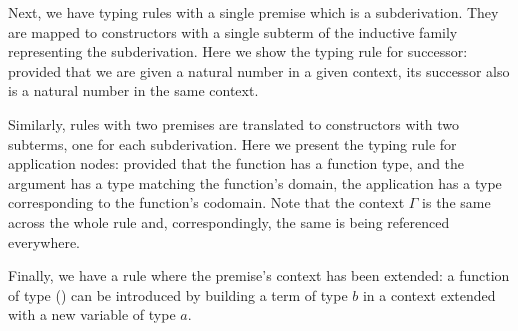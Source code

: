 Next, we have typing rules with a single premise which is a subderivation.
They are mapped to constructors with a single subterm of the inductive family
representing the subderivation.
%
Here we show the typing rule for successor: provided that we are given
a natural number in a given context, its successor also is a natural
number in the same context.

\begin{center}
\begin{minipage}{0.45\textwidth}
\inferenceInc
\end{minipage}\hfill
\begin{minipage}{0.45\textwidth}
\end{minipage}
\end{center}

Similarly, rules with two premises are translated to constructors
with two subterms, one for each subderivation.
%
Here we present the typing rule for application nodes: provided that
the function has a function type, and the argument has a type matching
the function's domain, the application has a type corresponding to the
function's codomain.
Note that the context $\Gamma$ is the same across the whole rule and,
correspondingly, the same  is being referenced everywhere.


\begin{center}
\begin{minipage}{0.35\textwidth}
\inferenceApp
\end{minipage}\hfill
\begin{minipage}{0.55\textwidth}
\end{minipage}
\end{center}

Finally, we have a rule where the premise's context has been extended:
a function of type () can be introduced by building a term
of type $b$ in a context extended with a new variable of type $a$.

\begin{center}
\begin{minipage}{0.35\textwidth}
\inferenceFunc
\end{minipage}\hfill
\begin{minipage}{0.55\textwidth}
\end{minipage}
\end{center}

